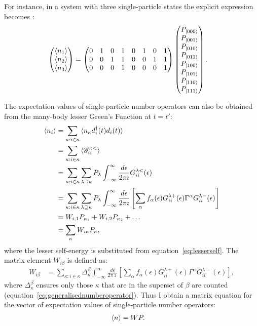 For instance, in a system with three single-particle states the explicit expression becomes \cite{seldenthuis}:
\begin{align*}
\begin{pmatrix} \braket{n_1} \\\braket{n_2} \\ \braket{n_3}\end{pmatrix} &= \begin{pmatrix} 0 & 1 & 0 & 1 & 0 & 1 & 0 & 1 \\ 0 & 0  &  1  & 1 & 0  &  0  &  1  &  1\\ 0 & 0 & 0 & 1 & 0 & 0 & 0 & 1\\\end{pmatrix} \begin{pmatrix} P_{\ket{000}} \\P_{\ket{001}} \\ P_{\ket{010}} \\ P_{\ket{011}} \\ P_{\ket{100}} \\ P_{\ket{101}} \\ P_{\ket{110}} \\ P_{\ket{111}} \end{pmatrix}.
\end{align*}

The expectation values of single-particle number operators can also be obtained from the  many-body lesser Green's Function at $t=t'$:
\begin{align*}
\braket{n_i} &= \sum_{\kappa: i \in \kappa} \braket{n_\kappa d_i^\dagger (t) d_i (t)} \\
&= \sum_{\kappa: i \in \kappa} \braket{\mathscr{G}^{\kappa<}_{ii}} \\
&= \sum_{\kappa: i \in \kappa} \sum_{\lambda \supseteq \kappa} P_\lambda \int^\infty_{-\infty} \frac{d\epsilon}{2\pi\imath} G^{\lambda<}_{ii} (\epsilon) \\
&= \sum_{\kappa: i \in \kappa} \sum_{\lambda \supseteq \kappa} P_\lambda \int^\infty_{-\infty} \frac{d\epsilon}{2\pi\imath} \left[ \sum_\alpha f_\alpha(\epsilon) G^{\lambda+}_{ii} (\epsilon) \Gamma^\alpha G^{\lambda-}_{ii} (\epsilon)\right] \\
&= W_{i,1} P_{\kappa_1} + W_{i, 2} P_{\kappa_2} + \ldots \\
&= \sum_\kappa W_{i\kappa} P_\kappa,
\end{align*} where the lesser self-energy is substituted from equation~\ref{eq:lesserself}. The matrix element $W_{i\beta}$ is defined as:
\begin{align*}
W_{i\beta} &= \sum_{\kappa: i \in \kappa} \Delta^\beta_\kappa \int^\infty_{-\infty} \frac{d\epsilon}{2\pi\imath} \left[ \sum_\alpha f_\alpha(\epsilon) G^{\lambda+}_{ii} (\epsilon) \Gamma^\alpha G^{\lambda-}_{ii} (\epsilon)\right],
\end{align*} where $\Delta^\beta_\kappa$ ensures only those $\kappa$ that are in the superset of $\beta$ are counted (equation~\ref{eq:generalisednumberoperator}). Thus I obtain a matrix equation for the vector of expectation values of single-particle number operators:
\begin{align}
\braket{n} &= WP. \label{eq:nwp}
\end{align}

